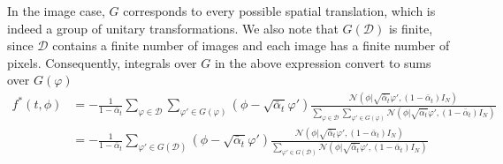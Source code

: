 \documentclass[a4paper,10pt]{article}
\theoremstyle{definition} %
\newtheorem{definition}{Définition}[section]
\theoremstyle{definition} %
\theoremstyle{definition} %
\newtheorem{theorem}[definition]{Theorem}
\theoremstyle{definition} %
\newcommand{\R}{\mathbb{R}}
\begin{document}
In the image case, $G$ corresponds to every possible spatial translation, which is indeed a group of unitary transformations. We also note that $G(\mathcal{D})$ is finite, since $\mathcal{D}$ contains a finite number of images and each image has a finite number of pixels. Consequently, integrals over $G$ in the above expression convert to sums over $G(\varphi)$ 
\begin{align*}
        f^*(t,\phi) &= -\frac{1}{1-\bar \alpha_t} \sum\limits_{\varphi \in \mathcal{D}} \sum\limits_{\varphi' \in G(\varphi)} (\phi - \sqrt{\bar \alpha_t} \varphi') \frac{\mathcal{N}(\phi | \sqrt{\bar \alpha_t} \varphi', (1-\bar \alpha_t) I_N) }{\sum\limits_{\varphi \in \mathcal{D}} \sum\limits_{\varphi'\in G(\varphi)} \mathcal{N}(\phi | \sqrt{\bar \alpha_t} \varphi', (1-\bar \alpha_t) I_N)}\\
        &= -\frac{1}{1-\bar \alpha_t}  \sum\limits_{\varphi' \in G(\mathcal{D})} (\phi - \sqrt{\bar \alpha_t} \varphi') \frac{\mathcal{N}(\phi | \sqrt{\bar \alpha_t} \varphi', (1-\bar \alpha_t) I_N) }{ \sum\limits_{\varphi'\in G(\mathcal{D})} \mathcal{N}(\phi | \sqrt{\bar \alpha_t} \varphi', (1-\bar \alpha_t) I_N)}
\end{align*}




\end{document}
